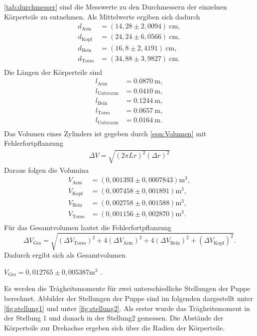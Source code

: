 \autoref{tab:durchmesser} sind die Messwerte zu den Durchmessern der einzelnen Körperteile zu entnehmen. Als Mittelwerte ergiben sich dadurch
\begin{align*}
  d_{\text{Arm}} &= (14,28 \pm 2,0094)\: \si{\centi\meter}, \\
  d_{\text{Kopf}} &= (24,24 \pm 6,0566)\: \si{\centi\meter}, \\
  d_{\text{Bein}} &= (16,8 \pm 2,4191)\: \si{\centi\meter}, \\
  d_{\text{Torso}} &= (34,88 \pm 3,9827)\: \si{\centi\meter}. \\ 
\end{align*}
Die Längen der Körperteile sind
\begin{align*}
  l_{\text{Arm}} &= \SI{0,0870}{\meter}, \\
  l_{\text{Unterarm}} &= \SI{0,0410}{\meter}, \\
  l_{\text{Bein}} &= \SI{0,1244}{\meter}, \\
  l_{\text{Torso}} &= \SI{0,0657}{\meter}, \\
  l_{\text{Unterarm}} &= \SI{0,0164}{\meter}. \\
\end{align*}
Das Volumen eines Zylinders ist gegeben durch \autoref{eqn:Volumen} mit Fehlerfortpflanzung
\begin{align*}
  \Delta V = \sqrt{(2 \pi Lr)^2 (\Delta r)^2}
\end{align*}
Daraus folgen die Volumina
\begin{align*}
  V_{\text{Arm}} &= (0,001393 \pm 0,0007843) \si{\meter}^3, \\
  V_{\text{Kopf}} &= (0,007458 \pm 0,001891) \si{\meter}^3, \\
  V_{\text{Bein}} &= (0,002758 \pm 0,001588) \si{\meter}^3 ,\\
  V_{\text{Torso}} &= (0,001156 \pm 0,002870) \si{\meter}^3. \\
\end{align*}
Für das Gesamtvolumen lautet die Fehlerfortpflanzung
\begin{equation}
  \Delta V_{\text{Ges}} = \sqrt{(\Delta V_{\text{Torso}})^2 + 4(\Delta V_{\text{Arm}})^2 + 4(\Delta V_{\text{Bein}})^2 + (\Delta V_{\text{Kopf}})^2}.
\end{equation}
Dadurch ergibt sich als Gesamtvolumen
\begin{center}
  $V_{\text{Ges}} = 0,012765 \pm 0,005387 \si{\meter}^3$ .
\end{center}

Es werden die Trägheitsmomente für zwei unterschiedliche Stellungen der Puppe berechnet. Abbilder der Stellungen der Puppe sind im folgenden
dargestellt unter \autoref{fig:stellung1} und unter \autoref{fig:stellung2}. 
Als erster wurde das Trägheitsmoment in der Stellung 1 und danach in der Stellung2 gemessen.
Die Abstände der Körperteile zur Drehachse ergeben sich über die Radien der Körperteile.

